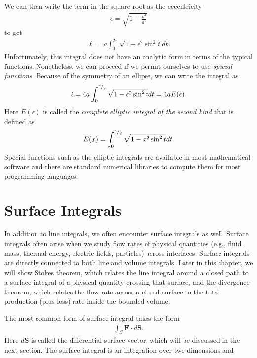We can then write the term in the square root as the eccentricity
\begin{align}
  \epsilon = \sqrt{ 1 - \frac{b^2}{a^2} }
\end{align}
to get
\begin{align}
  \ell = a \int_0^{2\pi}  \sqrt{ 1 - \epsilon^2 \sin^2 t } dt . 
\end{align}
Unfortunately, this integral does not have an analytic form in terms of the typical functions. Nonetheless, we can proceed if we permit ourselves to use \emph{special functions}. Because of the symmetry of an ellipse, we can write the integral as
\begin{align}
  \ell = 4a \int_0^{{}^{\pi}\!/_{2}}  \sqrt{ 1 - \epsilon^2 \sin^2 t } dt = 4a E(\epsilon). 
\end{align}
Here $E(\epsilon)$ is called the \emph{complete elliptic integral of the second kind} that is defined as
\begin{align}
  E(x) = \int_0^{{}^{\pi}\!/_{2}}  \sqrt{ 1 - x^2 \sin^2 t } dt. 
\end{align}
Special functions such as the elliptic integrals are available in most mathematical software and there are standard numerical libraries to compute them for most programming languages.

\section{Surface Integrals}

In addition to line integrals, we often encounter surface integrals as well. Surface integrals often arise when we study flow rates of physical quantities (e.g., fluid mass, thermal energy, electric fields, particles) across interfaces. Surface integrals are directly connected to both line and volume integrals. Later in this chapter, we will show Stokes theorem, which relates the line integral around a closed path to a surface integral of a physical quantity crossing that surface, and the divergence theorem, which relates the flow rate across a closed surface to the total production (plus loss) rate inside the bounded volume.

The most common form of surface integral takes the form
\begin{align}
  \int_S \mathbf{F} \cdot d\mathbf{S} .
\end{align}
Here $d\mathbf{S}$ is called the differential surface vector, which will be discussed in the next section. The surface integral is an integration over two dimensions and 

